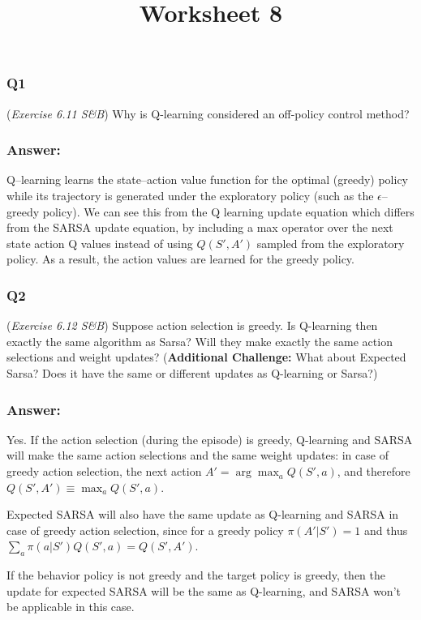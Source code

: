 \documentclass[a4paper, 10pt]{article}
\author{}
\date{}
\title{Worksheet 8 \vspace{-0.5cm}}
\begin{document}
\maketitle
\vspace{-2cm}

\subsubsection*{Q1}
(\textit{Exercise 6.11 S\&B})
Why is Q-learning considered an off-policy control method?

\subsubsection*{Answer:}
Q--learning learns the state--action value function for the optimal (greedy) policy while its trajectory is generated under the exploratory policy (such as the $\epsilon$--greedy policy). We can see this from the Q learning update equation which differs from the SARSA update equation, by including a max operator over the next state action Q values instead of using $Q(S', A')$ sampled from the exploratory policy. As a result, the action values are learned for the greedy policy.

\subsubsection*{Q2}
(\textit{Exercise 6.12 S\&B})
Suppose action selection is greedy. Is Q-learning then exactly the same
algorithm as Sarsa? Will they make exactly the same action selections and weight
updates? (\textbf{Additional Challenge:} What about Expected Sarsa? Does it have the same or different updates as Q-learning or Sarsa?)

\subsubsection*{Answer:}
Yes. If the action selection (during the episode) is greedy, Q-learning and SARSA will make the same action selections and the same weight updates: in case of greedy action selection, the next action $A' = \arg\max_a Q(S', a)$, and therefore $Q(S', A') \equiv \max_a Q(S', a)$.

Expected SARSA will also have the same update as Q-learning and SARSA in case of greedy action selection, since for a greedy policy $\pi(A'|S') = 1$ and thus $\sum_a \pi(a | S') Q(S', a) = Q(S', A')$.

If the behavior policy is not greedy and the target policy is greedy, then the update for expected SARSA will be the same as Q-learning, and SARSA won't be applicable in this case.
\end{document}

